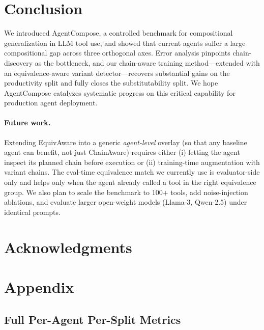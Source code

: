 ﻿\documentclass{article}
\begin{document}
\section{Conclusion}
\label{sec:conclusion}

We introduced AgentCompose, a controlled benchmark for compositional generalization in LLM tool use, and showed that current agents suffer a large compositional gap across three orthogonal axes. Error analysis pinpoints chain-discovery as the bottleneck, and our chain-aware training method---extended with an equivalence-aware variant detector---recovers substantial gains on the productivity split and fully closes the substitutability split. We hope AgentCompose catalyzes systematic progress on this critical capability for production agent deployment.

\paragraph{Future work.} Extending EquivAware into a generic \emph{agent-level} overlay (so that any baseline agent can benefit, not just ChainAware) requires either (i) letting the agent inspect its planned chain before execution or (ii) training-time augmentation with variant chains. The eval-time equivalence match we currently use is evaluator-side only and helps only when the agent already called a tool in the right equivalence group. We also plan to scale the benchmark to 100+ tools, add noise-injection ablations, and evaluate larger open-weight models (Llama-3, Qwen-2.5) under identical prompts.

\section*{Acknowledgments}




\appendix
\section{Appendix}
\label{app:llm}

\subsection{Full Per-Agent Per-Split Metrics}
\end{document}
